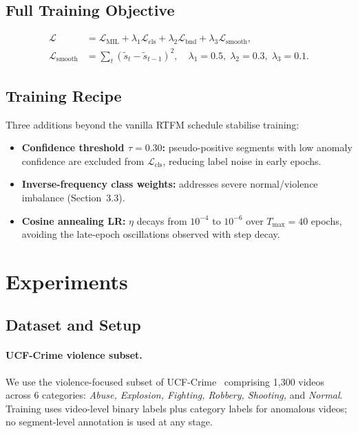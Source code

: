 \documentclass[sigconf,nonacm]{acmart}
\begin{document}
\subsection{Full Training Objective}

\begin{align}
  \mathcal{L} &= \mathcal{L}_\mathrm{MIL}
                 + \lambda_1 \mathcal{L}_\mathrm{cls}
                 + \lambda_2 \mathcal{L}_\mathrm{bnd}
                 + \lambda_3 \mathcal{L}_\mathrm{smooth}, \nonumber\\
  \mathcal{L}_\mathrm{smooth} &= \textstyle\sum_t(\tilde{s}_t-\tilde{s}_{t-1})^2,
  \quad \lambda_1{=}0.5,\;\lambda_2{=}0.3,\;\lambda_3{=}0.1.
\end{align}

\subsection{Training Recipe}

Three additions beyond the vanilla RTFM schedule stabilise training:
\begin{itemize}
  \item \textbf{Confidence threshold $\tau{=}0.30$:} pseudo-positive segments
        with low anomaly confidence are excluded from $\mathcal{L}_\mathrm{cls}$,
        reducing label noise in early epochs.
  \item \textbf{Inverse-frequency class weights:} addresses severe
        normal/violence imbalance (Section~3.3).
  \item \textbf{Cosine annealing LR:} $\eta$ decays from $10^{-4}$ to $10^{-6}$
        over $T_\mathrm{max}{=}40$ epochs, avoiding the late-epoch oscillations
        observed with step decay.
\end{itemize}


\section{Experiments}

\subsection{Dataset and Setup}

\paragraph{UCF-Crime violence subset.}
We use the violence-focused subset of UCF-Crime~\cite{sultani2018real}
comprising 1{,}300 videos across 6 categories: \emph{Abuse, Explosion,
Fighting, Robbery, Shooting,} and \emph{Normal}.
Training uses video-level binary labels plus category labels for anomalous
videos; no segment-level annotation is used at any stage.
\end{document}
